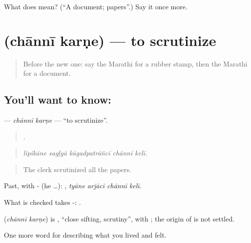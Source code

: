 \begin{tcolorbox}[breakable,colback=teal!4,colframe=teal!35!black,title={Before you move on}]
What does  mean? (\textquotedblleft{}A document; papers\textquotedblright{}.) Say it once more.
\end{tcolorbox}
\section[\texorpdfstring{\mr{छाननी} \mr{करणे} (chānnī karṇe)}{छाननी करणे (chānnī karṇe)}]{  (chānnī karṇe) — to scrutinize}

\label{lesson:MR-C506-channi-karne}



\begin{quote}
Before the new one: say the Marathi for a rubber stamp, then the Marathi for a document.
\end{quote}

\subsection*{You'll want to know:  }
\textbf{ } — \emph{chānnī karṇe} — \textquotedblleft{}to scrutinize\textquotedblright{}.

\begin{quote}
    .
\end{quote}

\begin{quote}
\emph{lipikāne sagḷyā kāgadpatrāñcī chānnī kelī.}
\end{quote}

\begin{quote}
The clerk scrutinized all the papers.
\end{quote}

Past, with - (he …):    , \emph{tyāne arjācī chānnī kelī}.

What is checked takes -:   .

\begin{cousinweb}
\textbf{ } (\emph{chānnī karṇe}) is , \textquotedblleft{}close sifting, scrutiny\textquotedblright{}, with ; the origin of  is not settled.
\end{cousinweb}

\begin{grammarlens}[title={What you've built}]
One more word for describing what you lived and felt.
\end{grammarlens}

